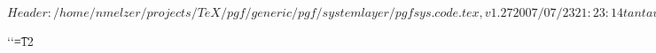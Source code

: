 %
%
%

\ProvidesPackageRCS[v\pgfversion] $Header: /home/nmelzer/projects/TeX/pgf/generic/pgf/systemlayer/pgfsys.code.tex,v 1.27 2007/07/23 21:23:14 tantau Exp $




\def\pgfset{\pgfqkeys{/pgf}}

%
% 
{\catcode`\catcode`\t=12\gdef\Pgf@geT#1pt{#1}}

\def\pgf@sys@tonumber#1{\expandafter\Pgf@geT\the#1}

\def\pgf@sys@bp@correct#1{#1=0.99627#1}

\def\pgf@sys@bp#1{%
  {%
    \pgf@x=#1\relax%
    \pgf@x=0.99627\pgf@x%
    \edef\temp{\expandafter\Pgf@geT\the\pgf@x\space}%
    \toks@\expandafter\expandafter\expandafter{\expandafter\pgfsysprotocol@currentprotocol\temp}%
    \xdef\pgfsysprotocol@currentprotocol{\the\toks@}%
  }%
}
\def\pgf@sys@pt#1{%
  {%
    \pgf@x=#1\relax%
    \edef\temp{\expandafter\Pgf@geT\the\pgf@x\space}%
    \toks@\expandafter\expandafter\expandafter{\expandafter\pgfsysprotocol@currentprotocol\temp}%
    \xdef\pgfsysprotocol@currentprotocol{\the\toks@}%
  }%
}


\newdimen\pgf@x
\newdimen\pgf@y
\newdimen\pgf@xa
\newdimen\pgf@ya
\newdimen\pgf@xb
\newdimen\pgf@yb
\newdimen\pgf@xc
\newdimen\pgf@yc

\newcount\c@pgf@counta
\newcount\c@pgf@countb
\newcount\c@pgf@countc
\newcount\c@pgf@countd



\newif\ifpgfsys@eorule



%
%

